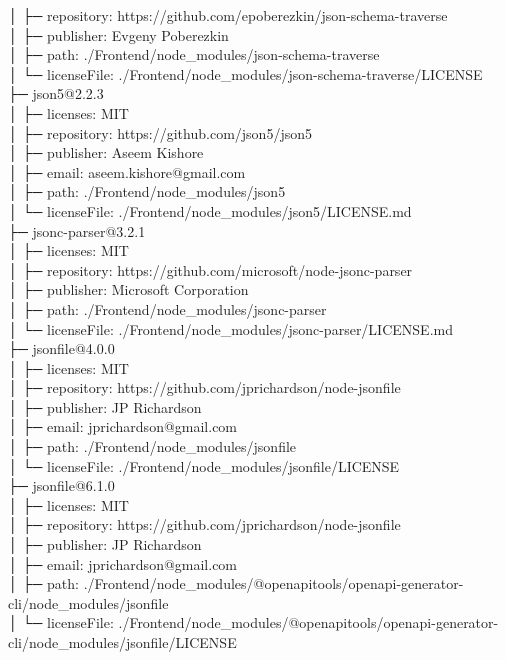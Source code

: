 │  ├─ repository: https://github.com/epoberezkin/json-schema-traverse\\
│  ├─ publisher: Evgeny Poberezkin\\
│  ├─ path: ./Frontend/node\_modules/json-schema-traverse\\
│  └─ licenseFile: ./Frontend/node\_modules/json-schema-traverse/LICENSE\\
├─ json5@2.2.3\\
│  ├─ licenses: MIT\\
│  ├─ repository: https://github.com/json5/json5\\
│  ├─ publisher: Aseem Kishore\\
│  ├─ email: aseem.kishore@gmail.com\\
│  ├─ path: ./Frontend/node\_modules/json5\\
│  └─ licenseFile: ./Frontend/node\_modules/json5/LICENSE.md\\
├─ jsonc-parser@3.2.1\\
│  ├─ licenses: MIT\\
│  ├─ repository: https://github.com/microsoft/node-jsonc-parser\\
│  ├─ publisher: Microsoft Corporation\\
│  ├─ path: ./Frontend/node\_modules/jsonc-parser\\
│  └─ licenseFile: ./Frontend/node\_modules/jsonc-parser/LICENSE.md\\
├─ jsonfile@4.0.0\\
│  ├─ licenses: MIT\\
│  ├─ repository: https://github.com/jprichardson/node-jsonfile\\
│  ├─ publisher: JP Richardson\\
│  ├─ email: jprichardson@gmail.com\\
│  ├─ path: ./Frontend/node\_modules/jsonfile\\
│  └─ licenseFile: ./Frontend/node\_modules/jsonfile/LICENSE\\
├─ jsonfile@6.1.0\\
│  ├─ licenses: MIT\\
│  ├─ repository: https://github.com/jprichardson/node-jsonfile\\
│  ├─ publisher: JP Richardson\\
│  ├─ email: jprichardson@gmail.com\\
│  ├─ path: ./Frontend/node\_modules/@openapitools/openapi-generator-cli/node\_modules/jsonfile\\
│  └─ licenseFile: ./Frontend/node\_modules/@openapitools/openapi-generator-cli/node\_modules/jsonfile/LICENSE\\
